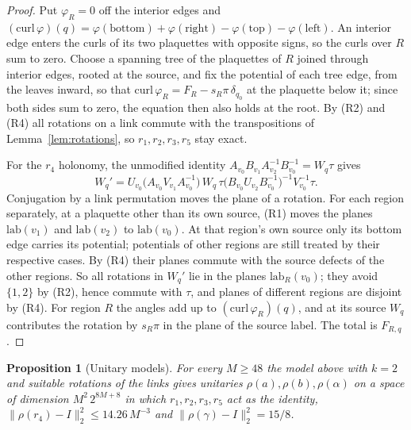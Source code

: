 \documentclass[11pt,a4paper]{article}
\theoremstyle{plain}
\newtheorem{proposition}[theorem]{Proposition}
\theoremstyle{definition}
\theoremstyle{remark}
\begin{document}
\begin{proof}
Put $\varphi_R=0$ off the interior edges and $(\mathrm{curl}\,\varphi)(q)=\varphi(\text{bottom})+\varphi(\text{right})-\varphi(\text{top})
-\varphi(\text{left})$. An interior edge enters the curls of its two plaquettes with opposite signs, so the curls over $R$ sum to zero.
Choose a spanning tree of the plaquettes of $R$ joined through interior edges, rooted at the source, and fix the potential of each tree edge,
from the leaves inward, so that $\mathrm{curl}\,\varphi_R=F_R-s_R\pi\,\delta_{q_0}$ at the plaquette below it; since both sides sum to zero,
the equation then also holds at the root. By (R2) and (R4) all rotations on a link commute with the transpositions of
Lemma~\ref{lem:rotations}, so $r_1,r_2,r_3,r_5$ stay exact.

For the $r_4$ holonomy, the unmodified identity $A_{v_0}B_{v_1}A_{v_2}^{-1}B_{v_0}^{-1}=W_q\tau$ gives
\[
W_q'=U_{v_0}\big(A_{v_0}V_{v_1}A_{v_0}^{-1}\big)\,W_q\,\tau\big(B_{v_0}U_{v_2}B_{v_0}^{-1}\big)^{-1}V_{v_0}^{-1}\tau .
\]
Conjugation by a link permutation moves the plane of a rotation. For each region separately, at a plaquette other than its own source,
(R1) moves the planes $\mathrm{lab}(v_1)$ and $\mathrm{lab}(v_2)$ to $\mathrm{lab}(v_0)$. At that region's own source only its bottom edge
carries its potential; potentials of other regions are still treated by their respective cases. By (R4) their planes commute with
the source defects of the other regions. So all rotations in $W_q'$ lie in the
planes $\mathrm{lab}_R(v_0)$; they avoid $\{1,2\}$ by (R2), hence commute with $\tau$, and planes of different regions are disjoint by (R4).
For region $R$ the angles add up to $(\mathrm{curl}\,\varphi_R)(q)$, and at its source $W_q$ contributes the rotation by $s_R\pi$ in the
plane of the source label. The total is $F_{R,q}$.
\end{proof}

\begin{proposition}[Unitary models]\label{prop:unitary-models}
For every $M\ge48$ the model above with $k=2$ and suitable rotations of the links gives unitaries $\rho(a),\rho(b),\rho(\alpha)$ on a space of
dimension $M^2\,2^{8M+8}$ in which $r_1,r_2,r_3,r_5$ act as the identity, $\|\rho(r_4)-I\|_2^2\le14.26\,M^{-3}$ and $\|\rho(\gamma)-I\|_2^2=15/8$.
\end{proposition}
\end{document}
